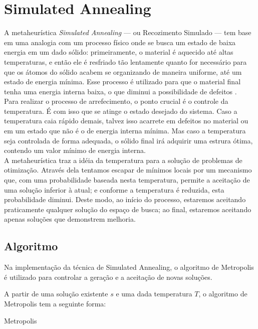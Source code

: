 \documentclass[10pt,a4paper,titlepage]{article}
\begin{document}
\section{Simulated Annealing}
	A metaheurística \emph{Simulated Annealing} --- ou Recozimento Simulado --- tem base em uma analogia com um processo físico onde se busca um estado de baixa energia em um dado sólido: primeiramente, o material é aquecido até altas temperaturas, e então ele é resfriado tão lentamente quanto for necessário para que os átomos do sólido acabem se organizando de maneira uniforme, até um estado de energia mínima. Esse processo é utilizado para que o material final tenha uma energia interna baixa, o que diminui a possibilidade de defeitos \cite{wikiSApt,wikiSAen}.
	\\
	Para realizar o processo de arrefecimento, o ponto crucial é o controle da temperatura. É com isso que se atinge o estado desejado do sistema. Caso a temperatura caia rápido demais, talvez isso acarrete em defeitos no material ou em um estado que não é o de energia interna mínima. Mas caso a temperatura seja controlada de forma adequada, o sólido final irá adquirir uma estrura ótima, contendo um valor mínimo de energia interna.
	\\
	A metaheurística traz a idéia da temperatura para a solução de problemas de otimização. Através dela tentamos escapar de mínimos locais por um mecanismo que, com uma probabilidade baseada nesta temperatura, permite a aceitação de uma solução inferior à atual; e conforme a temperatura é reduzida, esta probabilidade diminui. Deste modo, ao início do processo, estaremos aceitando praticamente qualquer solução do espaço de busca; ao final, estaremos aceitando apenas soluções que demonstrem melhoria.

\subsection{Algoritmo}
Na implementação da técnica de Simulated Annealing, o algoritmo de Metropolis \cite[p.~160-3]{aula} \cite{wikiMetropolisHastings} é utilizado para controlar a geração e a aceitação de novas soluções.

A partir de uma solução existente $s$ e uma dada temperatura $T$, o algoritmo de Metropolis tem a seguinte forma:

\begin{algorithm}[H]
 \LinesNumbered
 \;
 \caption{Metropolis} \label{alg:metro}
\end{algorithm}
\end{document}
